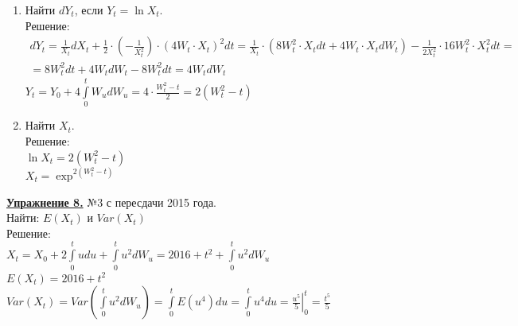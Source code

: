 \documentclass[a4paper]{article}
\begin{document}
\begin{enumerate}[label={\alph*)}]
\item Найти $dY_t$, если $Y_t=\ln X_t$.\\

Решение:
\begin{multline*} dY_t=\frac{1}{X_t}dX_t+\frac{1}{2}\cdot \left(-\frac{1}{X^{2}_{t}}\right)\cdot (4W_t\cdot X_t)^2dt=\frac{1}{X_t}\cdot \left(8W^{2}_{t}\cdot X_tdt+4W_t\cdot X_tdW_t\right)-\frac{1}{2X^{2}_{t}}\cdot 16W^{2}_{t}\cdot X^{2}_{t}dt=\\
=8W^{2}_{t}dt+4W_tdW_t-8W^{2}_{t}dt=4W_tdW_t
\end{multline*}
$Y_t=Y_0+4\int\limits_{0}^{t}W_udW_u=4\cdot \frac{W^{2}_{t}-t}{2}=2(W^{2}_{t}-t)$

\item Найти $X_t$.\\

Решение:\\

$\ln X_t=2(W^{2}_{t}-t)$\\

$X_t=\exp^{2(W^{2}_{t}-t)}$

\end{enumerate}

\par {\bf\underline{Упражнение 8.}} №3 с пересдачи 2015 года.\\

Найти: $E(X_t)$ и $Var(X_t)$\\

Решение:\\

$X_t=X_0+2\int\limits_{0}^{t}udu+\int\limits_{0}^{t}u^2dW_u=2016+t^2+\int\limits_{0}^{t}u^2dW_u$\\

$E(X_t)=2016+t^2$\\

$Var(X_t)=Var\left(\int\limits_{0}^{t}u^2dW_u\right)=\int\limits_{0}^{t}E(u^4)du=\int\limits_{0}^{t}u^4du=\left.\frac{u^5}{5}\right|_{0}^{t}=\frac{t^5}{5}$
\end{document}
